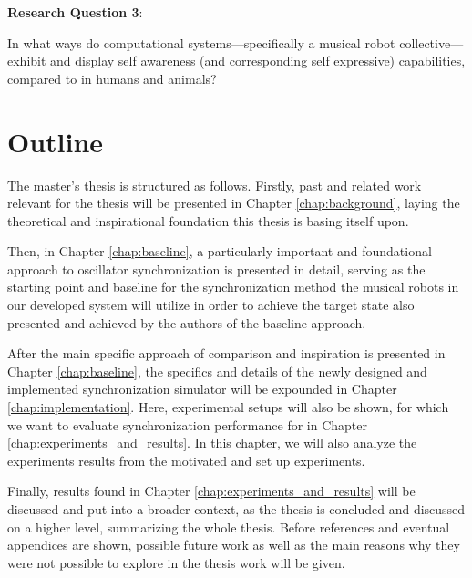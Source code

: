 \textbf{Research Question 3}:

In what ways do computational systems—specifically a musical robot collective—exhibit and display self awareness (and corresponding self expressive) capabilities, compared to in humans and animals? \nl







\section{Outline}

The master's thesis is structured as follows. Firstly, past and related work relevant for the thesis will be presented in Chapter \ref{chap:background}, laying the theoretical and inspirational foundation this thesis is basing itself upon.

Then, in Chapter \ref{chap:baseline}, a particularly important and foundational approach to oscillator synchronization is presented in detail, serving as the starting point and baseline for the synchronization method the musical robots in our developed system will utilize in order to achieve the target state also presented and achieved by the authors of the baseline approach.

After the main specific approach of comparison and inspiration is presented in Chapter \ref{chap:baseline}, the specifics and details of the newly designed and implemented synchronization simulator will be expounded in Chapter \ref{chap:implementation}. Here, experimental setups will also be shown, for which we want to evaluate synchronization performance for in Chapter \ref{chap:experiments_and_results}. In this chapter, we will also analyze the experiments results from the motivated and set up experiments.

Finally, results found in Chapter \ref{chap:experiments_and_results} will be discussed and put into a broader context, as the thesis is concluded and discussed on a higher level, summarizing the whole thesis. Before references and eventual appendices are shown, possible future work as well as the main reasons why they were not possible to explore in the thesis work will be given.

